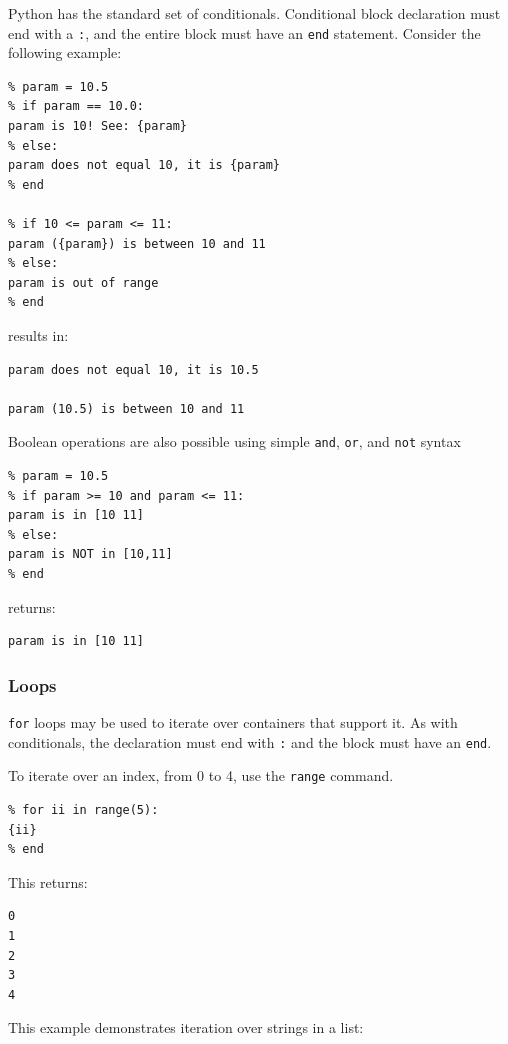 {Python has the standard set of conditionals. Conditional
block declaration must end with a \texttt{:}, and the entire block must
have an \texttt{end} statement. Consider the following example:

\begin{verbatim}
% param = 10.5
% if param == 10.0:
param is 10! See: {param}
% else:
param does not equal 10, it is {param}
% end

% if 10 <= param <= 11:
param ({param}) is between 10 and 11
% else:
param is out of range
% end
\end{verbatim}

results in:

\begin{verbatim}
param does not equal 10, it is 10.5

param (10.5) is between 10 and 11
\end{verbatim}

Boolean operations are also possible using simple \texttt{and},
\texttt{or}, and \texttt{not} syntax

\begin{verbatim}
% param = 10.5
% if param >= 10 and param <= 11:
param is in [10 11]
% else:
param is NOT in [10,11]
% end
\end{verbatim}

returns:

\begin{verbatim}
param is in [10 11]
\end{verbatim}

\subsubsection{Loops}\label{interfaces:loops}

\texttt{for} loops may be used to iterate over containers that
support it. As with conditionals, the declaration must end with
\texttt{:} and the block must have an \texttt{end}.

To iterate over an index, from 0 to 4, use the \texttt{range} command.

\begin{verbatim}
% for ii in range(5):
{ii}
% end
\end{verbatim}

This returns:

\begin{verbatim}
0
1
2
3
4
\end{verbatim}

This example demonstrates iteration over strings in a list:

}
